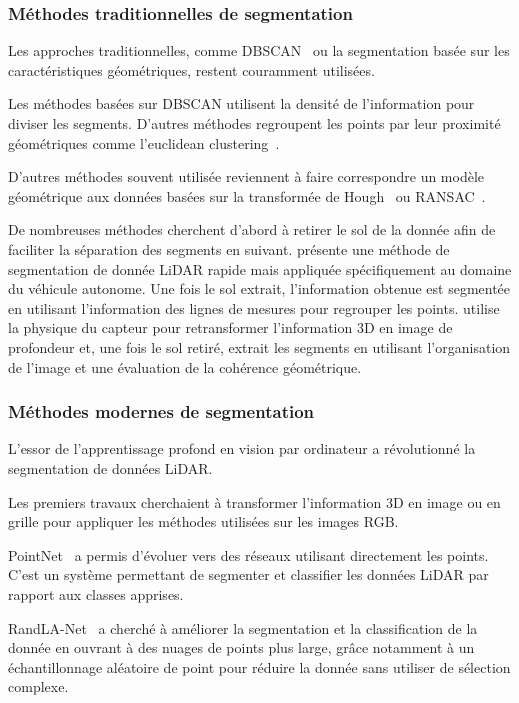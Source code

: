 \documentclass[a4paper, french, 10pt, onecolumn, notitlepage, roman]{article}
\begin{document}
\subsubsection{Méthodes traditionnelles de segmentation}
Les approches traditionnelles, comme DBSCAN~\cite{ester:ickddm:1996} ou la segmentation basée sur les caractéristiques géométriques, restent couramment utilisées.

Les méthodes basées sur DBSCAN utilisent la densité de l'information pour diviser les segments.
D'autres méthodes regroupent les points par leur proximité géométriques comme l'euclidean clustering~\cite{rusu:these:2009}.

D'autres méthodes souvent utilisée reviennent à faire correspondre un modèle géométrique aux données basées sur la transformée de Hough~\cite{hough::1962} ou RANSAC~\cite{fischler:acm:1981}.

De nombreuses méthodes cherchent d'abord à retirer le sol de la donnée afin de faciliter la séparation des segments en suivant.
\cite{zermas:icra:2017} présente une méthode de segmentation de donnée LiDAR rapide mais appliquée spécifiquement au domaine du véhicule autonome.
Une fois le sol extrait, l'information obtenue est segmentée en utilisant l'information des lignes de mesures pour regrouper les points.
\cite{bogoslavskyi:iros:2016} utilise la physique du capteur pour retransformer l'information 3D en image de profondeur et, une fois le sol retiré, extrait les segments en utilisant l'organisation de l'image et une évaluation de la cohérence géométrique.

\subsubsection{Méthodes modernes de segmentation}
L'essor de l'apprentissage profond en vision par ordinateur a révolutionné la segmentation de données LiDAR.

Les premiers travaux cherchaient à transformer l'information 3D en image ou en grille pour appliquer les méthodes utilisées sur les images RGB.

PointNet~\cite{qi:cvpr:2017,qi:arxiv:2017} a permis d'évoluer vers des réseaux utilisant directement les points.
C'est un système permettant de segmenter et classifier les données LiDAR par rapport aux classes apprises.

RandLA-Net~\cite{hu:cvpr:2020} a cherché à améliorer la segmentation et la classification de la donnée en ouvrant à des nuages de points plus large, grâce notamment à un échantillonnage aléatoire de point pour réduire la donnée sans utiliser de sélection complexe.
\end{document}
